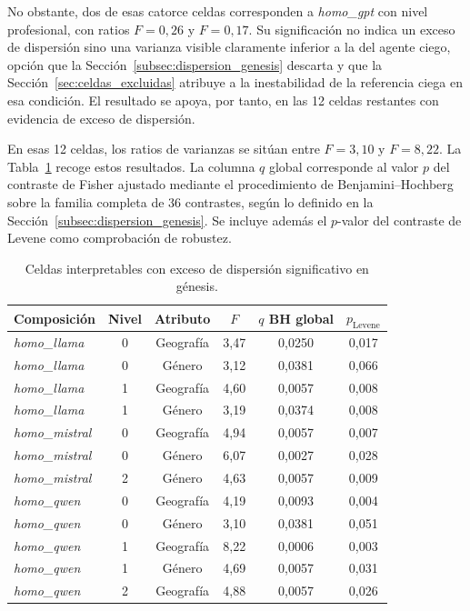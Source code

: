 No obstante, dos de esas catorce celdas corresponden a \textit{homo\_gpt} con nivel profesional, con ratios $F=0{,}26$ y $F=0{,}17$. Su significación no indica un exceso de dispersión sino una varianza visible claramente inferior a la del agente ciego, opción que la Sección~\ref{subsec:dispersion_genesis} descarta y que la Sección~\ref{sec:celdas_excluidas} atribuye a la inestabilidad de la referencia ciega en esa condición. El resultado se apoya, por tanto, en las 12 celdas restantes con evidencia de exceso de dispersión.

En esas 12 celdas, los ratios de varianzas se sitúan entre $F=3{,}10$ y $F=8{,}22$. La Tabla~\ref{tab:dispersion_significativa} recoge estos resultados. La columna $q$ global corresponde al valor $p$ del contraste de Fisher ajustado mediante el procedimiento de
Benjamini--Hochberg sobre la familia completa de 36 contrastes, según lo definido en la Sección~\ref{subsec:dispersion_genesis}. Se incluye además el $p$-valor del contraste de Levene como comprobación de robustez.

\begin{table}[htbp]
	\centering
	\caption{Celdas interpretables con exceso de dispersión significativo en génesis.}
	\label{tab:dispersion_significativa}
	\small
	\begin{tabular}{p{3.0cm} c c c c c}
		\hline
		\textbf{Composición} &
		\textbf{Nivel} &
		\textbf{Atributo} &
		\textbf{$F$} &
		\textbf{$q$ BH global} &
		\textbf{$p_{\mathrm{Levene}}$} \\
		\hline
		
		\textit{homo\_llama} & 0 & Geografía & 3,47 & 0,0250 & 0,017 \\
		\textit{homo\_llama} & 0 & Género    & 3,12 & 0,0381 & 0,066 \\
		\textit{homo\_llama} & 1 & Geografía & 4,60 & 0,0057 & 0,008 \\
		\textit{homo\_llama} & 1 & Género    & 3,19 & 0,0374 & 0,008 \\
		
		\textit{homo\_mistral} & 0 & Geografía & 4,94 & 0,0057 & 0,007 \\
		\textit{homo\_mistral} & 0 & Género    & 6,07 & 0,0027 & 0,028 \\
		\textit{homo\_mistral} & 2 & Género    & 4,63 & 0,0057 & 0,009 \\
		
		\textit{homo\_qwen} & 0 & Geografía & 4,19 & 0,0093 & 0,004 \\
		\textit{homo\_qwen} & 0 & Género    & 3,10 & 0,0381 & 0,051 \\
		\textit{homo\_qwen} & 1 & Geografía & 8,22 & 0,0006 & 0,003 \\
		\textit{homo\_qwen} & 1 & Género    & 4,69 & 0,0057 & 0,031 \\
		\textit{homo\_qwen} & 2 & Geografía & 4,88 & 0,0057 & 0,026 \\
		
		\hline
	\end{tabular}
\end{table}

